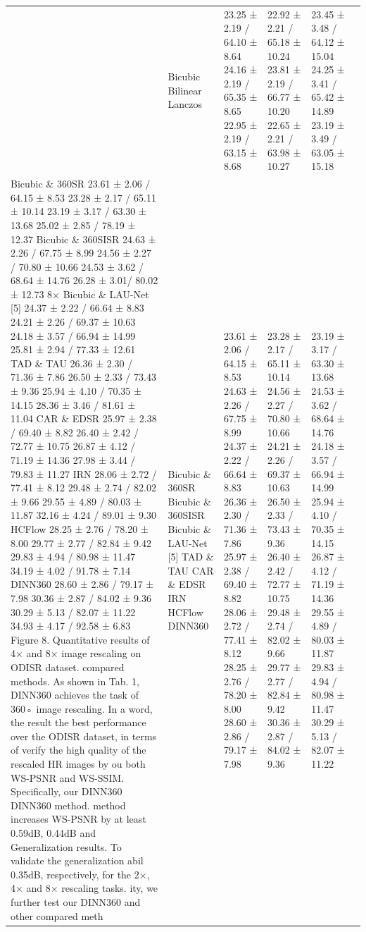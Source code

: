 \begin{tabular}{llllll}
 & Bicubic Bilinear Lanczos & 23.25 ± 2.19 / 64.10 ± 8.64 24.16 ± 2.19 / 65.35 ± 8.65 22.95 ± 2.19 / 63.15 ± 8.68 & 22.92 ± 2.21 / 65.18 ± 10.24 23.81 ± 2.19 / 66.77 ± 10.20 22.65 ± 2.21 / 63.98 ± 10.27 & 23.45 ± 3.48 / 64.12 ± 15.04 24.25 ± 3.41 / 65.42 ± 14.89 23.19 ± 3.49 / 63.05 ± 15.18 &  \\
Bicubic \& 360SR 23.61 ± 2.06 / 64.15 ± 8.53 23.28 ± 2.17 / 65.11 ± 10.14 23.19 ± 3.17 / 63.30 ± 13.68 25.02 ± 2.85 / 78.19 ± 12.37 Bicubic \& 360SISR 24.63 ± 2.26 / 67.75 ± 8.99 24.56 ± 2.27 / 70.80 ± 10.66 24.53 ± 3.62 / 68.64 ± 14.76 26.28 ± 3.01/ 80.02 ± 12.73 8× Bicubic \& LAU-Net [5] 24.37 ± 2.22 / 66.64 ± 8.83 24.21 ± 2.26 / 69.37 ± 10.63 24.18 ± 3.57 / 66.94 ± 14.99 25.81 ± 2.94 / 77.33 ± 12.61 TAD \& TAU 26.36 ± 2.30 / 71.36 ± 7.86 26.50 ± 2.33 / 73.43 ± 9.36 25.94 ± 4.10 / 70.35 ± 14.15 28.36 ± 3.46 / 81.61 ± 11.04 CAR \& EDSR 25.97 ± 2.38 / 69.40 ± 8.82 26.40 ± 2.42 / 72.77 ± 10.75 26.87 ± 4.12 / 71.19 ± 14.36 27.98 ± 3.44 / 79.83 ± 11.27 IRN 28.06 ± 2.72 / 77.41 ± 8.12 29.48 ± 2.74 / 82.02 ± 9.66 29.55 ± 4.89 / 80.03 ± 11.87 32.16 ± 4.24 / 89.01 ± 9.30 HCFlow 28.25 ± 2.76 / 78.20 ± 8.00 29.77 ± 2.77 / 82.84 ± 9.42 29.83 ± 4.94 / 80.98 ± 11.47 34.19 ± 4.02 / 91.78 ± 7.14 DINN360 28.60 ± 2.86 / 79.17 ± 7.98 30.36 ± 2.87 / 84.02 ± 9.36 30.29 ± 5.13 / 82.07 ± 11.22 34.93 ± 4.17 / 92.58 ± 6.83 Figure 8. Quantitative results of 4× and 8× image rescaling on ODISR dataset. compared methods. As shown in Tab. 1, DINN360 achieves the task of 360◦ image rescaling. In a word, the result the best performance over the ODISR dataset, in terms of verify the high quality of the rescaled HR images by ou both WS-PSNR and WS-SSIM. Specifically, our DINN360 DINN360 method. method increases WS-PSNR by at least 0.59dB, 0.44dB and Generalization results. To validate the generalization abil 0.35dB, respectively, for the 2×, 4× and 8× rescaling tasks. ity, we further test our DINN360 and other compared meth & Bicubic \& 360SR Bicubic \& 360SISR Bicubic \& LAU-Net [5] TAD \& TAU CAR \& EDSR IRN HCFlow DINN360 & 23.61 ± 2.06 / 64.15 ± 8.53 24.63 ± 2.26 / 67.75 ± 8.99 24.37 ± 2.22 / 66.64 ± 8.83 26.36 ± 2.30 / 71.36 ± 7.86 25.97 ± 2.38 / 69.40 ± 8.82 28.06 ± 2.72 / 77.41 ± 8.12 28.25 ± 2.76 / 78.20 ± 8.00 28.60 ± 2.86 / 79.17 ± 7.98 & 23.28 ± 2.17 / 65.11 ± 10.14 24.56 ± 2.27 / 70.80 ± 10.66 24.21 ± 2.26 / 69.37 ± 10.63 26.50 ± 2.33 / 73.43 ± 9.36 26.40 ± 2.42 / 72.77 ± 10.75 29.48 ± 2.74 / 82.02 ± 9.66 29.77 ± 2.77 / 82.84 ± 9.42 30.36 ± 2.87 / 84.02 ± 9.36 & 23.19 ± 3.17 / 63.30 ± 13.68 24.53 ± 3.62 / 68.64 ± 14.76 24.18 ± 3.57 / 66.94 ± 14.99 25.94 ± 4.10 / 70.35 ± 14.15 26.87 ± 4.12 / 71.19 ± 14.36 29.55 ± 4.89 / 80.03 ± 11.87 29.83 ± 4.94 / 80.98 ± 11.47 30.29 ± 5.13 / 82.07 ± 11.22 &  \\
\bottomrule
\end{tabular}
